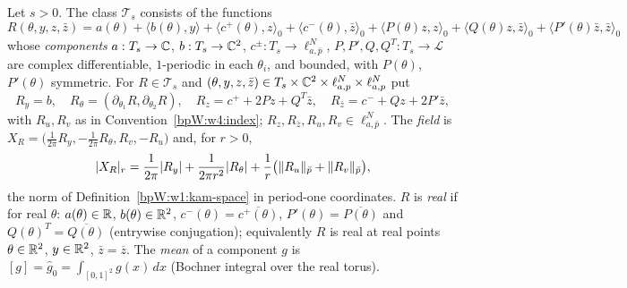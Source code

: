 \begin{definition}\label{bpW:w4:taylor}
Let $s>0$. The class $\mathcal T_s$ consists of the functions
\begin{equation}\label{bpW:w4:R}
R(\theta,y,z,\bar z)=a(\theta)+\langle b(\theta),y\rangle+\langle c^+(\theta),z\rangle_0+\langle c^-(\theta),\bar z\rangle_0
+\langle P(\theta)z,z\rangle_0+\langle Q(\theta)z,\bar z\rangle_0+\langle P'(\theta)\bar z,\bar z\rangle_0
\end{equation}
whose \emph{components} $a:T_s\to\mathbb{C}$, $b:T_s\to\mathbb{C}^2$, $c^\pm:T_s\to\ell^N_{a,\bar p}$, $P,P',Q,Q^T:T_s\to\mathcal L$ are
complex differentiable, $1$-periodic in each $\theta_i$, and bounded, with $P(\theta)$, $P'(\theta)$ symmetric. For
$R\in\mathcal T_s$ and $(\theta,y,z,\bar z)\in T_s\times\mathbb{C}^2\times\ell^N_{a,p}\times\ell^N_{a,p}$ put
\[R_y=b,\quad R_\theta=(\partial_{\theta_1}R,\partial_{\theta_2}R),\quad R_z=c^++2Pz+Q^T\bar z,\quad
R_{\bar z}=c^-+Qz+2P'\bar z,\]
with $R_u,R_v$ as in Convention~\ref{bpW:w4:index}; $R_z,R_{\bar z},R_u,R_v\in\ell^N_{a,\bar p}$. The \emph{field}
is $X_R=\bigl(\frac1{2\pi}R_y,-\frac1{2\pi}R_\theta,R_v,-R_u\bigr)$ and, for $r>0$,
\[\lvert X_R\rvert_r=\frac1{2\pi}\lvert R_y\rvert+\frac{1}{2\pi r^2}\lvert R_\theta\rvert+\frac1r\bigl(\lVert R_u\rVert_{\bar p}+\lVert R_v\rVert_{\bar p}\bigr),\]
the norm of Definition~\ref{bpW:w1:kam-space} in period-one coordinates. $R$ is \emph{real} if for real $\theta$:
$a(\theta)\in\mathbb{R}$, $b(\theta)\in\mathbb{R}^2$, $c^-(\theta)=\overline{c^+(\theta)}$, $P'(\theta)=\overline{P(\theta)}$ and
$Q(\theta)^T=\overline{Q(\theta)}$ (entrywise conjugation); equivalently $R$ is real at real points
$\theta\in\mathbb{R}^2$, $y\in\mathbb{R}^2$, $\bar z=\overline z$. The \emph{mean} of a component $g$ is
$[g]=\hat g_0=\int_{[0,1]^2}g(x)\,dx$ (Bochner integral over the real torus).
\end{definition}

